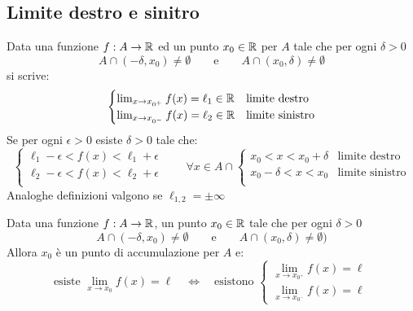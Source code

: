 \subsection{Limite destro e sinitro}
Data una funzione $f:A\rightarrow \mathbb{R}$ ed un punto $x_0 \in \mathbb{R}$ per $A$ tale che per ogni $\delta>0$
\[A\cap (-\delta,x_0)\neq \emptyset \qquad \text{e} \qquad A\cap (x_0,\delta)\neq \emptyset\]
si scrive:
\[\begin{cases}
\lim_{x\to x_{0^+}}{f(x)}=\ell_1 \in \mathbb{R} & \text{limite destro} \\
\lim_{x\to x_{0^-}}{f(x)}=\ell_2 \in \mathbb{R} & \text{limite sinistro}
\end{cases}\]
Se per ogni $\epsilon >0$ esiste $\delta > 0$ tale che:
\[\begin{cases}
\ell_1 - \epsilon < f(x) < \ell_1 + \epsilon \\
\ell_2 - \epsilon < f(x) < \ell_2 + \epsilon \\
\end{cases}
\qquad \forall x\in A \cap
\begin{cases}
x_0<x<x_0+\delta & \text{limite destro}\\
x_0-\delta<x<x_0 & \text{limite sinistro}\\
\end{cases}\]
Analoghe definizioni valgono se $\ell_{1,2}=\pm\infty$

\begin{prop}
Data una funzione $f:A\rightarrow \mathbb{R}$, un punto $x_0\in \mathbb{R}$ tale che per ogni $\delta>0$
\[A\cap(-\delta,x_0) \neq \emptyset \qquad \text{e} \qquad A\cap(x_0,\delta) \neq \emptyset)\]
Allora $x_0$ è un punto di accumulazione per $A$ e:
\[\text{esiste } \lim_{x\to x_0}f(x)=\ell \quad \Leftrightarrow \quad \text{esistono }
\begin{cases}
\lim_{x\to x_{0^+}}{f(x)}=\ell \\
\lim_{x\to x_{0^-}}{f(x)}=\ell
\end{cases}\]
\end{prop}

